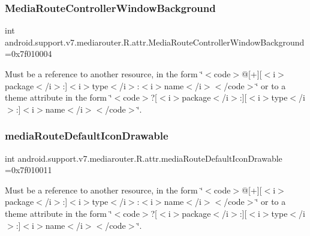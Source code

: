 \subsubsection{\texorpdfstring{Media\+Route\+Controller\+Window\+Background}{MediaRouteControllerWindowBackground}}
{\footnotesize\ttfamily int android.\+support.\+v7.\+mediarouter.\+R.\+attr.\+Media\+Route\+Controller\+Window\+Background =0x7f010004\hspace{0.3cm}{\ttfamily [static]}}

Must be a reference to another resource, in the form \char`\"{}$<$code$>$@\mbox{[}+\mbox{]}\mbox{[}$<$i$>$package$<$/i$>$\+:\mbox{]}$<$i$>$type$<$/i$>$\+:$<$i$>$name$<$/i$>$$<$/code$>$\char`\"{} or to a theme attribute in the form \char`\"{}$<$code$>$?\mbox{[}$<$i$>$package$<$/i$>$\+:\mbox{]}\mbox{[}$<$i$>$type$<$/i$>$\+:\mbox{]}$<$i$>$name$<$/i$>$$<$/code$>$\char`\"{}. \mbox{\label{classandroid_1_1support_1_1v7_1_1mediarouter_1_1R_1_1attr_a7345df6b560c834b09e5e2adc2bdd783}} 
\subsubsection{\texorpdfstring{media\+Route\+Default\+Icon\+Drawable}{mediaRouteDefaultIconDrawable}}
{\footnotesize\ttfamily int android.\+support.\+v7.\+mediarouter.\+R.\+attr.\+media\+Route\+Default\+Icon\+Drawable =0x7f010011\hspace{0.3cm}{\ttfamily [static]}}

Must be a reference to another resource, in the form \char`\"{}$<$code$>$@\mbox{[}+\mbox{]}\mbox{[}$<$i$>$package$<$/i$>$\+:\mbox{]}$<$i$>$type$<$/i$>$\+:$<$i$>$name$<$/i$>$$<$/code$>$\char`\"{} or to a theme attribute in the form \char`\"{}$<$code$>$?\mbox{[}$<$i$>$package$<$/i$>$\+:\mbox{]}\mbox{[}$<$i$>$type$<$/i$>$\+:\mbox{]}$<$i$>$name$<$/i$>$$<$/code$>$\char`\"{}. \mbox{\label{classandroid_1_1support_1_1v7_1_1mediarouter_1_1R_1_1attr_a6a01e3dd0b8440d79da229cf581c5c37}} 
